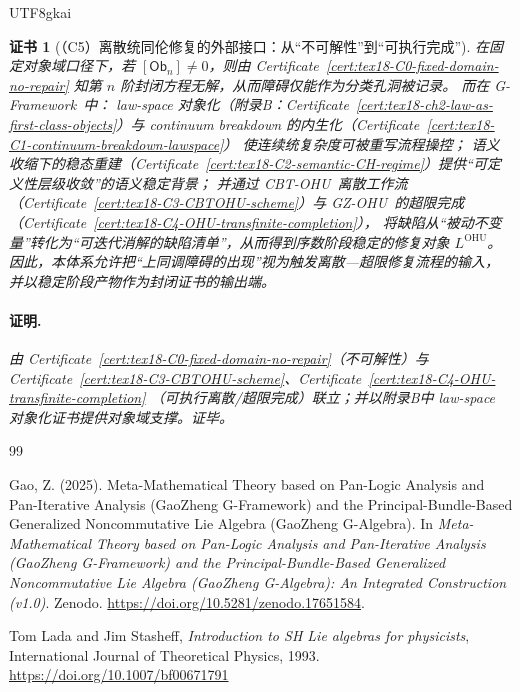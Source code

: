 \documentclass[12pt]{article}
\newtheorem{Certificate}{证书}[section]
\newcommand{\Ob}{\ensuremath{\mathsf{Ob}}}
\newcommand{\GFramework}{\textsf{G-Framework}}
\newcommand{\GZOHU}{\textsf{GZ-OHU}}
\newcommand{\CBTOHU}{\textsf{CBT-OHU}}
\begin{document}
\begin{CJK*}{UTF8}{gkai}
\begin{Certificate}[（C5）离散统同伦修复的外部接口：从“不可解性”到“可执行完成”]
\label{cert:tex18-C5-discrete-homotopy-repair-interface}
在固定对象域口径下，若 $[\Ob_n]\neq 0$，则由 Certificate~\ref{cert:tex18-C0-fixed-domain-no-repair}
知第 $n$ 阶封闭方程无解，从而障碍仅能作为分类孔洞被记录。
而在 \GFramework\ 中：
law-space 对象化（附录B：Certificate~\ref{cert:tex18-ch2-law-as-first-class-objects}）与 continuum breakdown
  的内生化（Certificate~\ref{cert:tex18-C1-continuum-breakdown-lawspace}）
使连续统复杂度可被重写流程操控；
语义收缩下的稳态重建（Certificate~\ref{cert:tex18-C2-semantic-CH-regime}）提供“可定义性层级收敛”的语义稳定背景；
并通过 \CBTOHU\ 离散工作流（Certificate~\ref{cert:tex18-C3-CBTOHU-scheme}）与 \GZOHU\ 的超限完成（Certificate~\ref{cert:tex18-C4-OHU-transfinite-completion}），
将缺陷从“被动不变量”转化为“可迭代消解的缺陷清单”，从而得到序数阶段稳定的修复对象 $L^{\mathrm{OHU}}$。
因此，本体系允许把“上同调障碍的出现”视为触发离散—超限修复流程的输入，并以稳定阶段产物作为封闭证书的输出端。
\paragraph{证明.}
由 Certificate~\ref{cert:tex18-C0-fixed-domain-no-repair}（不可解性）与
Certificate~\ref{cert:tex18-C3-CBTOHU-scheme}、Certificate~\ref{cert:tex18-C4-OHU-transfinite-completion}
（可执行离散/超限完成）联立；并以附录B中 law-space 对象化证书提供对象域支撑。证毕。
\end{Certificate}

\clearpage

\renewcommand{\refname}{\texorpdfstring{参考文献}{References}}
\begin{thebibliography}{99}

Gao, Z. (2025).
\newblock Meta-Mathematical Theory based on Pan-Logic Analysis and
Pan-Iterative Analysis (GaoZheng G-Framework) and the
Principal-Bundle-Based Generalized Noncommutative Lie Algebra
(GaoZheng G-Algebra).
\newblock In \emph{Meta-Mathematical Theory based on Pan-Logic Analysis and
Pan-Iterative Analysis (GaoZheng G-Framework) and the
Principal-Bundle-Based Generalized Noncommutative Lie Algebra
(GaoZheng G-Algebra): An Integrated Construction (v1.0)}.
\newblock Zenodo.
\newblock \url{https://doi.org/10.5281/zenodo.17651584}.


Tom Lada and Jim Stasheff,
\emph{Introduction to SH Lie algebras for physicists},
International Journal of Theoretical Physics, 1993.
\\ \url{https://doi.org/10.1007/bf00671791}


\end{thebibliography}
\end{CJK*}
\end{document}
